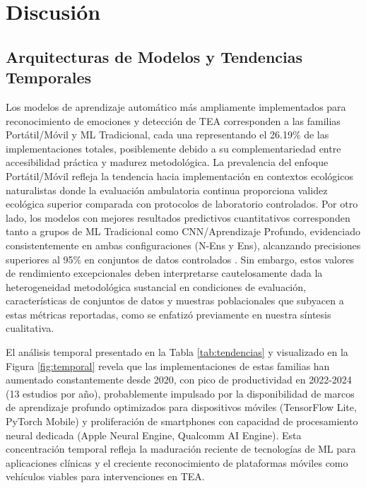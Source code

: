 \documentclass{ieeeaccess}
\begin{document}
	\section{Discusión}
	\label{sec:discusion}
	
	\subsection{Arquitecturas de Modelos y Tendencias Temporales}
	
	Los modelos de aprendizaje automático más ampliamente implementados para reconocimiento de emociones y detección de TEA corresponden a las familias Portátil/Móvil y ML Tradicional, cada una representando el 26.19\% de las implementaciones totales, posiblemente debido a su complementariedad entre accesibilidad práctica y madurez metodológica. La prevalencia del enfoque Portátil/Móvil refleja la tendencia hacia implementación en contextos ecológicos naturalistas donde la evaluación ambulatoria continua proporciona validez ecológica superior comparada con protocolos de laboratorio controlados. Por otro lado, los modelos con mejores resultados predictivos cuantitativos corresponden tanto a grupos de ML Tradicional como CNN/Aprendizaje Profundo, evidenciado consistentemente en ambas configuraciones (N-Ens y Ens), alcanzando precisiones superiores al 95\% en conjuntos de datos controlados \cite{b20}. Sin embargo, estos valores de rendimiento excepcionales deben interpretarse cautelosamente dada la heterogeneidad metodológica sustancial en condiciones de evaluación, características de conjuntos de datos y muestras poblacionales que subyacen a estas métricas reportadas, como se enfatizó previamente en nuestra síntesis cualitativa.
	
	El análisis temporal presentado en la Tabla \ref{tab:tendencias} y visualizado en la Figura \ref{fig:temporal} revela que las implementaciones de estas familias han aumentado constantemente desde 2020, con pico de productividad en 2022-2024 (13 estudios por año), probablemente impulsado por la disponibilidad de marcos de aprendizaje profundo optimizados para dispositivos móviles (TensorFlow Lite, PyTorch Mobile) y proliferación de smartphones con capacidad de procesamiento neural dedicada (Apple Neural Engine, Qualcomm AI Engine). Esta concentración temporal refleja la maduración reciente de tecnologías de ML para aplicaciones clínicas y el creciente reconocimiento de plataformas móviles como vehículos viables para intervenciones en TEA.
	
\end{document}
